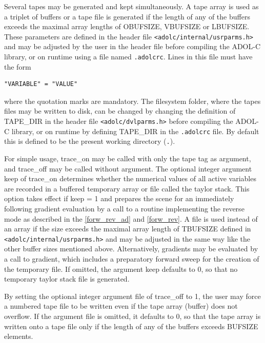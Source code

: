 \documentclass[11pt,twoside]{article}
\begin{document}
Several tapes may be generated and kept simultaneously.
A tape array is used as a triplet of buffers or a tape file is generated if
the length of any of the buffers exceeds the maximal array lengths of 
{\sf OBUFSIZE}, {\sf VBUFSIZE} or {\sf LBUFSIZE}. These parameters are
defined in the header file \verb=<adolc/internal/usrparms.h>=
and may be adjusted by the user in the header file before compiling
the ADOL-C library, or on runtime using a file named \verb=.adolcrc=. 
Lines in this file must have the form
\begin{verbatim}
"VARIABLE" = "VALUE"
\end{verbatim}
where the quotation marks are mandatory.
The filesystem folder, where the tapes files may be written to disk, 
can be changed by changing the definition of {\sf TAPE\_DIR} in
the header file \verb=<adolc/dvlparms.h>= before 
compiling the ADOL-C library, or on runtime by defining {\sf
  TAPE\_DIR} in the \verb=.adolcrc= file. By default this is defined
to be the present working directory (\verb=.=).

For simple usage, {\sf trace\_on} may be called with only the tape
{\sf tag} as argument, and {\sf trace\_off} may be called 
without argument. The optional integer argument {\sf keep} of 
{\sf trace\_on} determines whether the numerical values of all
active variables are recorded in a buffered temporary array or file
called the taylor stack. 
This option takes effect if
{\sf keep} = 1 and prepares the scene for an immediately following
gradient evaluation by a call to a routine implementing the reverse mode
as described in the \autoref{forw_rev_ad} and \autoref{forw_rev}. A
file is used instead of an array if the size exceeds the maximal array
length of {\sf TBUFSIZE} defined in \verb=<adolc/internal/usrparms.h>= and may
be adjusted in the same way like the other buffer sizes mentioned above.
Alternatively, gradients may be evaluated by a call
to {\sf gradient}, which includes a preparatory forward sweep
for the creation of the temporary file. If omitted, the argument 
{\sf  keep} defaults to 0, so that no temporary
taylor stack file is generated. 

By setting the optional integer argument {\sf file} of 
{\sf  trace\_off} to 1, the user may force a numbered  tape
file to be written even if the tape array (buffer) does not overflow.
If the argument {\sf file} is omitted, it 
defaults to 0, so that the tape array is written onto a tape file only 
if the length of any of the buffers exceeds {\sf [OLVT]BUFSIZE} elements.
\end{document}
